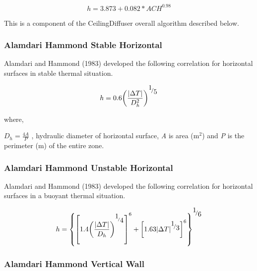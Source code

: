 \begin{equation}
h = 3.873 + 0.082 * AC{H^{0.98}}
\end{equation}

This is a component of the CeilingDiffuser overall algorithm described below.

\subsubsection{Alamdari Hammond Stable Horizontal}\label{alamdari-hammond-stable-horizontal}

Alamdari and Hammond (1983) developed the following correlation for horizontal surfaces in stable thermal situation.

\begin{equation}
h = 0.6{\left( {\frac{{\left| {\Delta T} \right|}}{{D_h^2}}} \right)^{{\raise0.7ex\hbox{1} \!\mathord{\left/ {\vphantom {1 5}}\right.}\!\lower0.7ex\hbox{5}}}}
\end{equation}

where,

\({D_h} = \frac{{4A}}{P}\) , hydraulic diameter of horizontal surface, \emph{A} is area (m\(^{2}\)) and \emph{P} is the perimeter (m) of the entire zone.

\subsubsection{Alamdari Hammond Unstable Horizontal}\label{alamdari-hammond-unstable-horizontal}

Alamdari and Hammond (1983) developed the following correlation for horizontal surfaces in a buoyant thermal situation.

\begin{equation}
h = {\left\{ {{{\left[ {1.4{{\left( {\frac{{\left| {\Delta T} \right|}}{{{D_h}}}} \right)}^{^{{\raise0.7ex\hbox{1} \!\mathord{\left/ {\vphantom {1 4}}\right.}\!\lower0.7ex\hbox{4}}}}}} \right]}^6} + {{\left[ {1.63{{\left| {\Delta T} \right|}^{{\raise0.7ex\hbox{1} \!\mathord{\left/ {\vphantom {1 3}}\right.}\!\lower0.7ex\hbox{3}}}}} \right]}^6}} \right\}^{{\raise0.7ex\hbox{1} \!\mathord{\left/ {\vphantom {1 6}}\right.}\!\lower0.7ex\hbox{6}}}}
\end{equation}

\subsubsection{Alamdari Hammond Vertical Wall}\label{alamdari-hammond-vertical-wall}

